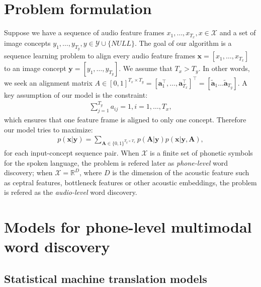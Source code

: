 \documentclass[journal]{IEEEtran}
\newcommand{\reals}{\mathbb R}
\begin{document}
\section{Problem formulation}
Suppose we have a sequence of audio feature frames $x_1, \ldots, x_{T_x}, x \in \mathcal X$ and a set of image concepts $y_1, \ldots, y_{T_y}, y \in \mathcal Y \cup \{NULL\}$. The goal of our algorithm is a sequence learning problem to align every audio feature frames $\mathbf x = [x_1, \ldots, x_{T_x}]$ to an image concept $\mathbf y = [y_1, \ldots, y_{T_y}]$. We assume that $T_x > T_y$. In other words, we seek an alignment matrix $A \in [0, 1]^{T_x \times T_y}=[\mathbf a_1^\top, \ldots, \mathbf a_{T_x}^{\top}]^{\top} = [\tilde{\mathbf a}_1 \ldots \tilde{\mathbf a}_{T_y}]$. A key assumption of our model is the constraint:
\begin{align}\label{eq:one-concept-assumption}
    \sum_{j=1}^{T_y} a_{ij} = 1, i = 1, \ldots, T_x,
\end{align}
which ensures that one feature frame is aligned to only one concept. Therefore our model tries to maximize:
\begin{align}\label{eq:trans_prob}
    p(\mathbf{x}|\mathbf{y}) = \sum_{\mathbf{A}\in \{0, 1\}^{T_y  \times T_x}} p(\mathbf{A}|\mathbf{y}) p(\mathbf{x}|\mathbf{y}, \mathbf{A}),
\end{align}
for each input-concept sequence pair. When $\mathcal X$ is a finite set of phonetic symbols for the spoken language, the problem is refered later as \textit{phone-level} word discovery; when $\mathcal X = \reals^{D}$, where $D$ is the dimension of the acoustic feature such as ceptral features, bottleneck features or other acoustic embeddings, the problem is refered as the \textit{audio-level} word discovery.

\section{Models for phone-level multimodal word discovery}
\subsection{Statistical machine translation models}
\end{document}
